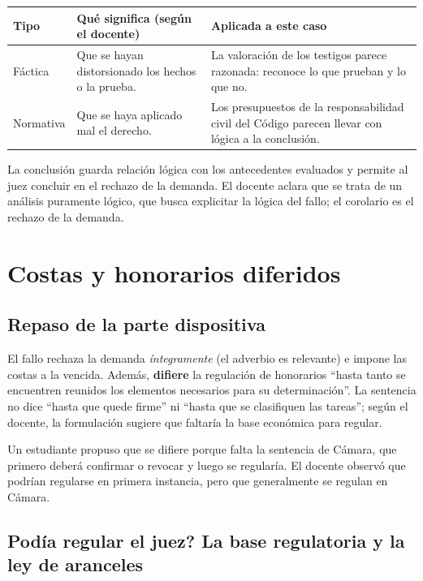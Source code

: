 \documentclass[12pt,oneside]{book}
\begin{document}
\begin{center}
\small
\begin{tabularx}{\textwidth}{@{}p{2.6cm}XX@{}}
\toprule
\textbf{Tipo} & \textbf{Qu\'e significa (seg\'un el docente)} & \textbf{Aplicada a este caso} \\
\midrule
F\'actica & Que se hayan distorsionado los hechos o la prueba. & La valoraci\'on de los testigos parece razonada: reconoce lo que prueban y lo que no. \\
\addlinespace
Normativa & Que se haya aplicado mal el derecho. & Los presupuestos de la responsabilidad civil del C\'odigo parecen llevar con l\'ogica a la conclusi\'on. \\
\bottomrule
\end{tabularx}
\end{center}

La conclusi\'on guarda relaci\'on l\'ogica con los antecedentes evaluados y permite al juez concluir en el rechazo de la demanda. El docente aclara que se trata de un an\'alisis puramente l\'ogico, que busca explicitar la l\'ogica del fallo; el corolario es el rechazo de la demanda.

\section{Costas y honorarios diferidos}

\subsection{Repaso de la parte dispositiva}

El fallo rechaza la demanda \emph{\'integramente} (el adverbio es relevante) e impone las costas a la vencida. Adem\'as, \textbf{difiere} la regulaci\'on de honorarios ``hasta tanto se encuentren reunidos los elementos necesarios para su determinaci\'on''. La sentencia no dice ``hasta que quede firme'' ni ``hasta que se clasifiquen las tareas''; seg\'un el docente, la formulaci\'on sugiere que faltar\'ia la base econ\'omica para regular.

Un estudiante propuso que se difiere porque falta la sentencia de C\'amara, que primero deber\'a confirmar o revocar y luego se regular\'ia. El docente observ\'o que podr\'ian regularse en primera instancia, pero que generalmente se regulan en C\'amara.

\subsection{\textquestiondown Pod\'ia regular el juez? La base regulatoria y la ley de aranceles}
\end{document}
